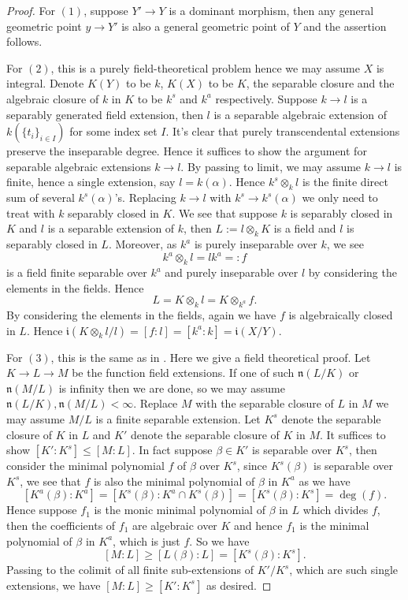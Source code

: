 \documentclass[letterpaper,reqno,12pt]{amsart}
\numberwithin{equation}{section}
\theoremstyle{plain}
\begin{document}
\begin{proof}
    For $(1)$, suppose $Y'\to Y$ is a dominant morphism, then any general geometric point $y\to Y'$ is also a general geometric point of $Y$ and the assertion  follows.

    For $(2)$, this is a purely field-theoretical problem hence we may assume $X$ is integral. Denote $K(Y)$ to be $k$, $K(X)$ to be $K$, the separable closure and the algebraic closure of $k$ in $K$ to be $k^s$ and $k^a$ respectively. Suppose $k\to l$ is a separably generated field extension, then $l$ is a separable algebraic extension of $k(\{t_i\}_{i\in I})$ for some index set $I$. It's clear that purely transcendental extensions preserve the inseparable degree. Hence it suffices to show the argument for separable algebraic extensions $k\to l$. By passing to limit, we may assume $k\to l$ is finite, hence a single extension, say $l=k(\alpha)$. Hence $k^s\otimes_k l$ is the finite direct sum of several $k^s(\alpha)$'s. Replacing $k\to l$ with $k^s\to k^s(\alpha)$ we only need to treat with $k$ separably closed in $K$. We see that suppose $k$ is separably closed in $K$ and $l$ is a separable extension of $k$, then $L:=l\otimes_k K$ is a field and $l$ is separably closed in $L$. Moreover, as $k^a$ is purely inseparable over $k$, we see \[k^a\otimes_k l=lk^a=:f\] is a field finite separable over $k^a$ and purely inseparable over $l$ by considering the elements in the fields. Hence \[L=K\otimes_k l=K\otimes_{k^a}f.\] By considering the elements in the fields, again we have $f$ is algebraically closed in $L$. Hence $\mathfrak i(K\otimes_k l/l)=[f:l]=[k^a:k]=\mathfrak i(X/Y)$.

    For $(3)$, this is the same as in \cite[Lemma 2.9]{sdeglogcalabiyau}. Here we give a field theoretical proof. Let $K\to L\to M$ be the function field extensions. If one of such $\mathfrak n(L/K)$ or $\mathfrak n(M/L)$ is infinity then we are done, so we may assume $\mathfrak n(L/K),\mathfrak n(M/L)<\infty$. Replace $M$ with the separable closure of $L$ in $M$ we may assume $M/L$ is a finite separable extension. Let $K^s$ denote the separable closure of $K$ in $L$ and $K'$ denote the separable closure of $K$ in $M$. It suffices to show $[K':K^s]\leq [M:L]$. In fact suppose $\beta\in K'$ is separable over $K^s$, then consider the minimal polynomial $f$ of $\beta$ over $K^s$, since $K^s(\beta)$ is separable over $K^s$, we see that $f$ is also the minimal polynomial of $\beta$ in $K^a$ as we have \[[K^a(\beta):K^a]=[K^s(\beta):K^a\cap K^s(\beta)]=[K^s(\beta):K^s]=\deg(f).\]  Hence suppose $f_1$ is the monic minimal polynomial of $\beta$ in $L$ which divides $f$, then the coefficients of $f_1$ are algebraic over $K$ and hence $f_1$ is the minimal polynomial of $\beta$ in $K^a$, which is just $f$. So we have \[[M:L]\geq [L(\beta):L]= [K^s(\beta):K^s].\] Passing to the colimit of all finite sub-extensions of $K'/K^s$, which are  such single extensions, we have $[M:L]\geq [K':K^s]$ as desired.


\end{proof}
\end{document}
